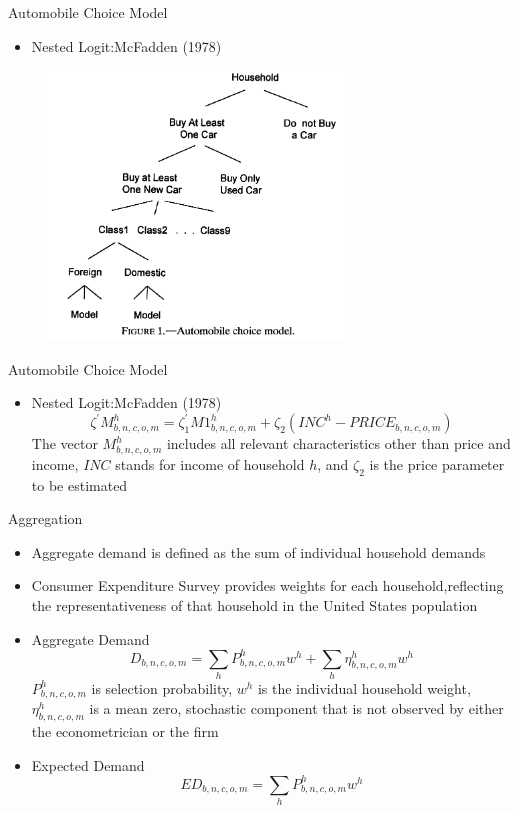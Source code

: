 \documentclass{beamer}
\begin{document}
\begin{frame}{Automobile Choice Model}
\begin{itemize}
	\item Nested Logit:McFadden (1978)
\end{itemize}
\begin{figure}[h]
	\centering
	\includegraphics[width=8cm]{Figure1.png}
\end{figure}
\end{frame}
\begin{frame}{Automobile Choice Model}
\begin{itemize}
	\item Nested Logit:McFadden (1978) \\
	$$\zeta^{\prime} M_{b, n, c, o, m}^{h}=\zeta_{1}^{\prime} M 1_{b, n, c, o, m}^{h}+\zeta_{2}\left(I N C^{h}-P R I C E_{b, n, c, o, m}\right)$$
	The vector $M_{b, n, c, o, m}^{h}$ includes all relevant characteristics other than price and income, $INC$ stands for income of household $h$, and $\zeta_{2}$ is the price parameter to be estimated
\end{itemize}
\end{frame}
\begin{frame}{Aggregation}
\begin{itemize}
	\item Aggregate demand is defined as the sum of individual household demands
	\item Consumer Expenditure Survey provides weights for each household,reflecting the representativeness of that household in the United States population
	\item Aggregate Demand
	$$D_{b, n, c, o, m}=\sum_{h} P_{b, n, c, o, m}^{h} w^{h}+\sum_{h} \eta_{b, n, c, o, m}^{h} w^{h}$$
	$P_{b, n, c, o, m}^{h}$ is selection probability, $w^{h}$ is the individual household weight, $\eta_{b, n, c, o, m}^{h}$ is a mean zero, stochastic component that is not observed by either the econometrician or the firm
	\item Expected Demand
	$$ED_{b, n, c, o, m}=\sum_{h} P_{b, n, c, o, m}^{h} w^{h}$$
\end{itemize}
\end{frame}
\end{document}
